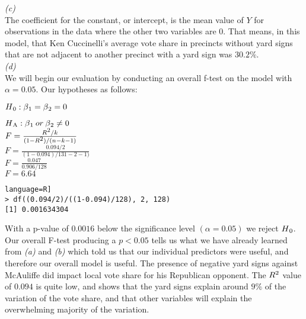 \documentclass[12pt,letterpaper]{article}
\begin{document}
\noindent\textit{(c)}\\

\noindent The coefficient for the constant, or intercept, is the mean value of $Y$ for observations in the data where the other two variables are 0. That means, in this model, that Ken Cuccinelli's average vote share in precincts without yard signs that are not adjacent to another precinct with a yard sign was $30.2\%$.\\

\noindent\textit{(d)}\\

\noindent We will begin our evaluation by conducting an overall f-test on the model with $\alpha = 0.05$. Our hypotheses as follows:

\noindent $H\textsubscript{0}: \beta\textsubscript{1} = \beta\textsubscript{2} = 0$ 

\noindent $H\textsubscript{A}:  \beta\textsubscript{1} \: or \:  \beta\textsubscript{2} \neq 0$ \\

\noindent$F = \frac{R\textsuperscript{2}/k}{(1-R\textsuperscript{2})/(n-k-1)}$\\

\noindent$F = \frac{0.094/2}{(1-0.094)/131-2-1)}$\\

\noindent$F = \frac{0.047}{0.906/128}$\\

\noindent$F = 6.64$\\

\begin{lstlisting}language=R]
> df((0.094/2)/((1-0.094)/128), 2, 128)
[1] 0.001634304
\end{lstlisting}

\noindent With a p-value of $0.0016$ below the significance level $(\alpha = 0.05)$ we reject $H\textsubscript{0}$.\\

\noindent Our overall F-test producing a $p < 0.05$ tells us what we have already learned from \textit{(a)} and \textit{(b)} which told us that our individual predictors were useful, and therefore our overall model is useful. The presence of negative yard signs against McAuliffe did impact local vote share for his Republican opponent. The $R\textsuperscript{2}$ value of $0.094$ is quite low, and shows that the yard signs explain around $9\%$ of the variation of the vote share, and that other variables will  explain the overwhelming majority of the variation.
\end{document}
